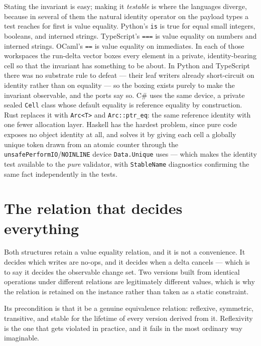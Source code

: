 \documentclass[11pt,twoside,openright]{book}
\newcommand{\code}[1]{\texorpdfstring{\textcolor{d7ink}{\texttt{#1}}}{#1}}
\begin{document}
Stating the invariant is easy; making it \emph{testable} is where the languages
diverge, because in several of them the natural identity operator on the payload
types a test reaches for first is value equality. Python's \code{is} is true for
equal small integers, booleans, and interned strings. TypeScript's \code{===} is
value equality on numbers and interned strings. OCaml's \code{==} is value
equality on immediates. In each of those workspaces the run-delta vector boxes
every element in a private, identity-bearing cell so that the invariant has
something to be about. In Python and TypeScript there was no substrate rule to
defeat --- their leaf writers already short-circuit on identity rather than on
equality --- so the boxing exists purely to make the invariant observable, and
the ports say so. C\# uses the same device, a private sealed \code{Cell}
class whose default equality is reference equality by construction. Rust
replaces it with \code{Arc<T>} and \code{Arc::ptr\_eq}: the same reference
identity with one fewer allocation layer. Haskell has the hardest problem, since
pure code exposes no object identity at all, and solves it by giving each cell a
globally unique token drawn from an atomic counter through the
\code{unsafePerformIO}/\code{NOINLINE} device \code{Data.Unique} uses --- which
makes the identity test available to the \emph{pure} validator, with
\code{StableName} diagnostics confirming the same fact independently in the
tests.

\section{The relation that decides everything}

Both structures retain a value equality relation, and it is not a convenience.
It decides which writes are no-ops, and it decides when a delta cancels ---
which is to say it decides the observable change set. Two versions built from
identical operations under different relations are legitimately different
values, which is why the relation is retained on the instance rather than taken
as a static constraint.

Its precondition is that it be a genuine equivalence relation: reflexive,
symmetric, transitive, and stable for the lifetime of every version derived from
it. Reflexivity is the one that gets violated in practice, and it fails in the
most ordinary way imaginable.
\end{document}
